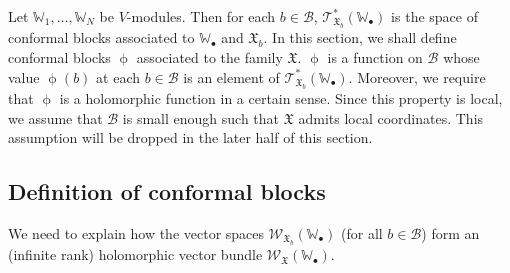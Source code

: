 \documentclass[11pt,b5paper,notitlepage]{article}
\theoremstyle{definition}
\theoremstyle{plain}
\newcommand{\fk}{\mathfrak}
\newcommand{\mc}{\mathcal}
\newcommand{\scr}{\mathscr}
\newcommand{\blt}{\bullet}
\newcommand{\Wbb}{\mathbb W}
\numberwithin{equation}{section}
\begin{document}
Let $\Wbb_1,\dots,\Wbb_N$ be $V$-modules. Then for each $b\in\mc B$, $\scr T_{\fk X_b}^*(\Wbb_\blt)$ is the space of conformal blocks associated to $\Wbb_\blt$ and $\fk X_b$. In this section, we shall define conformal blocks $\upphi$ associated to the family $\fk X$. $\upphi$ is a function on $\mc B$ whose value $\upphi(b)$ at each $b\in\mc B$ is an element of $\scr T_{\fk X_b}^*(\Wbb_\blt)$. Moreover, we require that $\upphi$ is a holomorphic function in a certain sense. Since this property is local, we  assume  that $\mc B$ is small enough such that $\fk X$ admits local coordinates. This assumption will be dropped in the later half of this section.



\subsection*{Definition of conformal blocks}

We need to explain how the vector spaces $\scr W_{\fk X_b}(\Wbb_\blt)$ (for all $b\in\mc B$) form an (infinite rank) holomorphic vector bundle $\scr W_{\fk X}(\Wbb_\blt)$.
\end{document}
